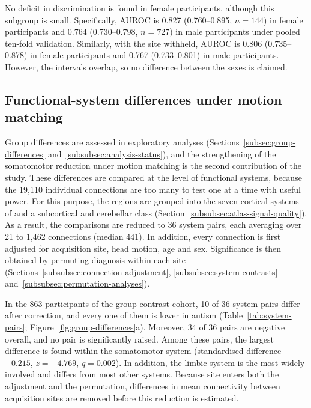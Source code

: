 No deficit in discrimination is found in female participants, although this subgroup is
small.
Specifically, AUROC is 0.827 (0.760--0.895, $n=144$) in female participants and 0.764
(0.730--0.798, $n=727$) in male participants under pooled ten-fold validation. Similarly,
with the site withheld, AUROC is 0.806 (0.735--0.878) in female participants and 0.767
(0.733--0.801) in male participants. However, the intervals overlap, so no difference
between the sexes is claimed.

\subsection{Functional-system differences under motion matching}
\label{subsec:results-system-differences}

Group differences are assessed in exploratory analyses (Sections~\ref{subsec:group-differences}
and~\ref{subsubsec:analysis-status}), and the strengthening of the somatomotor reduction under motion
matching is the second contribution of the study. These differences are compared at the
level of functional systems, because the 19,110 individual connections are too many to
test one at a time with useful power. For this purpose, the regions are grouped into the seven cortical systems of \citet{Yeoetal2011}
and a subcortical and cerebellar class (Section~\ref{subsubsec:atlas-signal-quality}). As a result, the
comparisons are reduced to 36 system pairs, each averaging over 21 to 1,462 connections
(median 441). In addition, every connection is first adjusted for acquisition site, head
motion, age and sex. Significance is then obtained by permuting diagnosis within each site
(Sections~\ref{subsubsec:connection-adjustment}, \ref{subsubsec:system-contrasts} and~\ref{subsubsec:permutation-analyses}).

In the 863 participants of the group-contrast cohort, 10 of 36 system pairs differ after
correction, and every one of them is lower in autism (Table~\ref{tab:system-pairs};
Figure~\ref{fig:group-differences}a). Moreover, 34 of 36 pairs are negative overall, and no pair
is significantly raised. Among these pairs, the largest difference is found within the
somatomotor system (standardised difference $-0.215$, $z=-4.769$, $q=0.002$). In addition,
the limbic system is the most widely involved and differs from most other systems. Because
site enters both the adjustment and the permutation, differences in mean connectivity
between acquisition sites are removed before this reduction is estimated.


